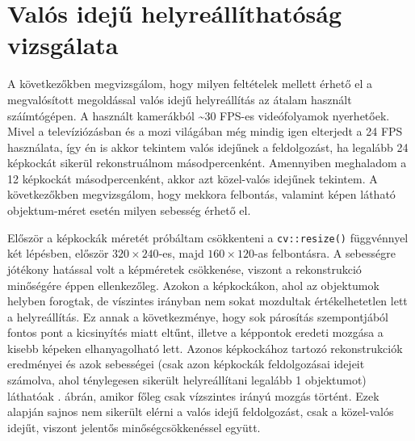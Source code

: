 \section{Valós idejű helyreállíthatóság vizsgálata}

A következőkben megvizsgálom, hogy milyen feltételek mellett érhető el a megvalósított megoldással valós idejű helyreállítás az átalam használt száímtógépen. A használt kamerákból \textasciitilde 30 FPS-es videófolyamok nyerhetőek. Mivel a televíziózásban és a mozi világában még mindig igen elterjedt a 24 FPS használata, így én is akkor tekintem valós idejűnek a feldolgozást, ha legalább 24 képkockát sikerül rekonstruálnom másodpercenként. Amennyiben meghaladom a 12 képkockát másodpercenként, akkor azt közel-valós idejűnek tekintem. A következőkben megvizsgálom, hogy mekkora felbontás, valamint képen látható objektum-méret esetén milyen sebesség érhető el.

Először a képkockák méretét próbáltam csökkenteni a \texttt{cv::resize()} függvénnyel két lépésben, először $320\times 240$-es, majd $160\times 120$-as felbontásra. A sebességre jótékony hatással volt a képméretek csökkenése, viszont a rekonstrukció minőségére éppen ellenkezőleg. Azokon a képkockákon, ahol az objektumok helyben forogtak, de víszintes irányban nem sokat mozdultak értékelhetetlen lett a helyreállítás. Ez annak a következménye, hogy sok párosítás szempontjából fontos pont a kicsinyítés miatt eltűnt, illetve a képpontok eredeti mozgása a kisebb képeken elhanyagolható lett. Azonos képkockához tartozó rekonstrukciók eredményei és azok sebességei (csak azon képkockák feldolgozásai idejeit számolva, ahol ténylegesen sikerült helyreállítani legalább 1 objektumot) láthatóak . ábrán, amikor főleg csak vízszintes irányú mozgás történt. Ezek alapján sajnos nem sikerült elérni a valós idejű feldolgozást, csak a közel-valós idejűt, viszont jelentős minőségcsökkenéssel együtt.

